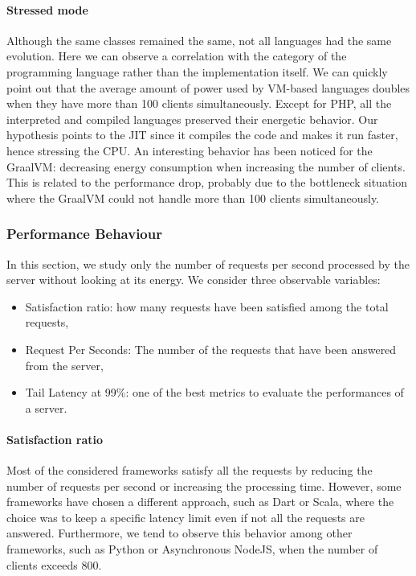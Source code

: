 \paragraph{Stressed mode}
Although the same classes remained the same, not all languages had the same evolution. Here we can observe a correlation with the category of the programming language rather than the implementation itself.
We can quickly point out that the average amount of power used by VM-based languages doubles when they have more than 100 clients simultaneously.
Except for PHP, all the interpreted and compiled languages preserved their energetic behavior.
Our hypothesis points to the JIT since it compiles the code and makes it run faster, hence stressing the CPU.
An interesting behavior has been noticed for the GraalVM: decreasing energy consumption when increasing the number of clients.
This is related to the performance drop, probably due to the bottleneck situation where the GraalVM could not handle more than 100 clients simultaneously.

\subsubsection{Performance Behaviour}
In this section, we study only the number of requests per second processed by the server without looking at its energy.
We consider three observable variables:
\begin{itemize}
    \item \textsf{Satisfaction ratio}: how many requests have been satisfied among the total requests,
    \item \textsf{Request Per Seconds}: The number of the requests that have been answered from the server,
    \item \textsf{Tail Latency at 99\%}: one of the best metrics to evaluate the performances of a server.
\end{itemize}

\paragraph{Satisfaction ratio}
Most of the considered frameworks satisfy all the requests by reducing the number of requests per second or increasing the processing time.
However, some frameworks have chosen a different approach, such as Dart or Scala, where the choice was to keep a specific latency limit even if not all the requests are answered.
Furthermore, we tend to observe this behavior among other frameworks, such as Python or Asynchronous NodeJS, when the number of clients exceeds 800.

